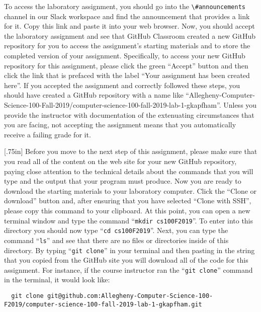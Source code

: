 \documentclass[11pt]{article}
\newcommand{\command}[1]{``\lstinline{#1}''}
\newcommand{\channel}[1]{\lstinline{#1}}
\newcommand{\caution}[1]{\null\hfill\LARGE{\faWarning{}}\newline\scriptsize{\em{#1}}}
\begin{document}
To access the laboratory assignment, you should go into the
\channel{\#announcements} channel in our Slack workspace and find the
announcement that provides a link for it. Copy this link and paste it into your
web browser. Now, you should accept the laboratory assignment and see that
GitHub Classroom created a new GitHub repository for you to access the
assignment's starting materials and to store the completed version of your
assignment. Specifically, to access your new GitHub repository for this
assignment, please click the green ``Accept'' button and then click the link
that is prefaced with the label ``Your assignment has been created here''. If
you accepted the assignment and correctly followed these steps, you should have
created a GitHub repository with a name like
``Allegheny-Computer-Science-100-Fall-2019/computer-science-100-fall-2019-lab-1-gkapfham''.
Unless you provide the instructor with documentation of the extenuating
circumstances that you are facing, not accepting the assignment means that you
automatically receive a failing grade for it.

\marginnote{\caution{Clone GitHub repository}}[.75in] Before you move to the
next step of this assignment, please make sure that you read all of the content
on the web site for your new GitHub repository, paying close attention to the
technical details about the commands that you will type and the output that
your program must produce. Now you are ready to download the starting materials
to your laboratory computer. Click the ``Clone or download'' button and, after
ensuring that you have selected ``Clone with SSH'', please copy this command to
your clipboard. At this point, you can open a new terminal window and type the
command \command{mkdir cs100F2019}. To enter into this directory you should now
type \command{cd cs100F2019}. Next, you can type the command \command{ls} and
see that there are no files or directories inside of this directory. By typing
\command{git clone} in your terminal and then pasting in the string that you
copied from the GitHub site you will download all of the code for this
assignment. For instance, if the course instructor ran the \command{git clone}
command in the terminal, it would look like:

\begin{lstlisting}
  git clone git@github.com:Allegheny-Computer-Science-100-F2019/computer-science-100-fall-2019-lab-1-gkapfham.git
\end{lstlisting}
\end{document}
